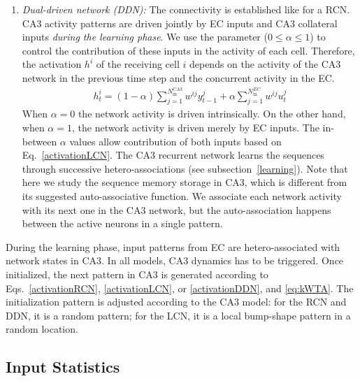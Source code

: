 \documentclass[utf8]{frontiersSCNS} %
\begin{document}
\begin{enumerate}
\item \textit{Dual-driven network (DDN):} The connectivity is established like for a RCN.
%
CA3 activity patterns are driven jointly by EC inputs and CA3 collateral inputs \textit{during the learning phase}.
%
We use the parameter ($0 \leq \alpha \leq 1$) to control the contribution of these inputs in the activity of each cell. 
%
Therefore, the activation $h^i$ of the receiving cell $i$ depends on the activity of the CA3 network in the previous time step and the concurrent activity in the EC.
%
\begin{align}
\label{activationDDN}
h^{i}_{t} = (1 - \alpha) \sum_{j = 1}^{N^{CA3}_\mathrm{in}} {{w^{ij} y^{j}_{t-1}}} + \alpha \sum_{j = 1}^{N^{EC}_\mathrm{in}} {{w^{ij} u^{j}_{t}}} 
\end{align}
%
When $\alpha = 0$ the network activity is driven intrinsically. On the other hand, when $\alpha = 1$, the network activity is driven merely by EC inputs. The in-between $\alpha$ values allow contribution of both inputs based on Eq.~\ref{activationLCN}.        
%
The CA3 recurrent network learns the sequences through successive hetero-associations (see subsection~\ref{learning}).
%
Note that here we study the sequence memory storage in CA3, which is different from its suggested auto-associative function. We associate each network activity with its next one in the CA3 network, but the auto-association happens between the active neurons in a single pattern.
\end{enumerate}

During the learning phase, input patterns from EC are hetero-associated with network states in CA3. In all models, CA3 dynamics has to be triggered. Once initialized, the next pattern in CA3 is generated according to Eqs.~\ref{activationRCN}, \ref{activationLCN}, or \ref{activationDDN}, and \ref{eq:kWTA}.
%
The initialization pattern is adjusted according to the CA3 model: for the RCN and DDN, it is a random pattern; for the LCN, it is a local bump-shape pattern in a random location.
%

\subsection{Input Statistics}
\end{document}
